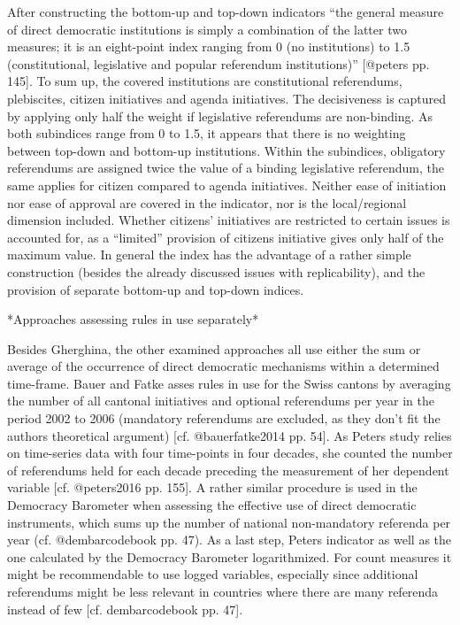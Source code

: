 \documentclass{systats}
\begin{document}
After constructing the bottom-up and top-down indicators “the general measure of direct democratic institutions is simply a combination of the latter two measures; it is an eight-point index ranging from 0 (no institutions) to 1.5 (constitutional, legislative and popular referendum institutions)” [@peters pp. 145]. To sum up, the covered institutions are constitutional referendums, plebiscites, citizen initiatives and agenda initiatives. The decisiveness is captured by applying only half the weight if legislative referendums are non-binding. As both subindices range from 0 to 1.5, it appears that there is no weighting between top-down and bottom-up institutions. Within the subindices, obligatory referendums are assigned twice the value of a binding legislative referendum, the same applies for citizen compared to agenda initiatives. Neither ease of initiation nor ease of approval are covered in the indicator, nor is the local/regional dimension included. Whether citizens’ initiatives are restricted to certain issues is accounted for, as a “limited” provision of citizens initiative gives only half of the maximum value. In general the index has the advantage of a rather simple construction (besides the already discussed issues with replicability), and the provision of separate bottom-up and top-down indices. 

*Approaches assessing rules in use separately*



Besides Gherghina, the other examined approaches all use either the sum or average of the occurrence of direct democratic mechanisms within  a determined time-frame. Bauer and Fatke asses rules in use for the Swiss cantons by averaging the number of all cantonal initiatives and optional referendums per year in the period 2002 to 2006 (mandatory referendums are excluded, as they don’t fit the authors theoretical argument) [cf. @bauerfatke2014 pp. 54]. As Peters study relies on time-series data with four time-points in four decades, she counted the number of referendums held for each decade preceding the measurement of her dependent variable [cf. @peters2016 pp. 155]. A rather similar procedure is used in the Democracy Barometer when assessing the effective use of direct democratic instruments, which sums up the number of national non-mandatory referenda per year (cf. @dembarcodebook pp. 47). As a last step, Peters indicator as well as the one calculated by the Democracy Barometer logarithmized. For count measures it might be recommendable to use logged variables, especially since additional referendums might be less relevant in countries where there are many referenda instead of few [cf. dembarcodebook pp. 47]. 
\end{document}
